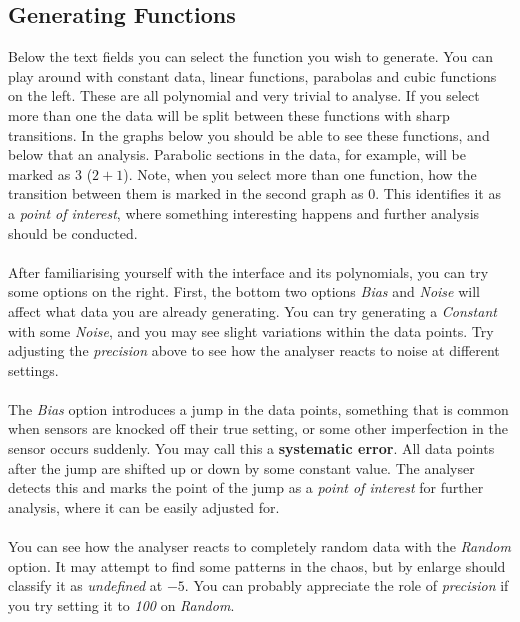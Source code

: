 \documentclass[main.tex]{subfiles}
\begin{document}
    \subsection{Generating Functions}
    
      Below the text fields you can select the function you wish to generate. You can play around with constant data, linear functions, parabolas and cubic functions on the left. These are all polynomial and very trivial to analyse. If you select more than one the data will be split between these functions with sharp transitions. In the graphs below you should be able to see these functions, and below that an analysis. Parabolic sections in the data, for example, will be marked as $3$ ($2+1$). Note, when you select more than one function, how the transition between them is marked in the second graph as $0$. This identifies it as a \textit{point of interest}, where something interesting happens and further analysis should be conducted.
      \\\\
      After familiarising yourself with the interface and its polynomials, you can try some options on the right. First, the bottom two options \textit{Bias} and \textit{Noise} will affect what data you are already generating. You can try generating a \textit{Constant} with some \textit{\textit{Noise}}, and you may see slight variations within the data points. Try adjusting the \textit{precision} above to see how the analyser reacts to noise at different settings.
      \\\\
      The \textit{Bias} option introduces a jump in the data points, something that is common when sensors are knocked off their true setting, or some other imperfection in the sensor occurs suddenly. You may call this a \textbf{systematic error}. All data points after the jump are shifted up or down by some constant value. The analyser detects this and marks the point of the jump as a \textit{point of interest} for further analysis, where it can be easily adjusted for. 
      \\\\
      You can see how the analyser reacts to completely random data with the \textit{Random} option. It may attempt to find some patterns in the chaos, but by enlarge should classify it as \textit{undefined} at $-5$. You can probably appreciate the role of \textit{precision} if you try setting it to \textit{100} on \textit{Random}.
      \\\\
\end{document}
